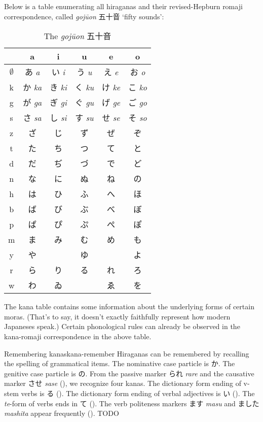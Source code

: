 \documentclass[UTF8, a4paper, oneside, scheme=plain]{ctexrep}
\newcommand{\corpus}[1]{\emph{#1}}
\newcommand{\translate}[1]{`#1'}
\begin{document}
Below is a table enumerating all hiraganas and their revised-Hepburn romaji correspondence, 
called \corpus{gojūon} 五十音 \translate{fifty sounds}:
\begin{table}[H]
    \caption{The \corpus{gojūon} 五十音}
    \label{tbl:hiragana-chart}
    \centering
    \begin{tabular}{cccccc}
        \toprule
         & a & i & u & e & o \\ 
        \midrule
        $\emptyset$ & あ \corpus{a} & い \corpus{i} & う \corpus{u} & え \corpus{e} & お \corpus{o} \\ 
        k & か \corpus{ka} & き \corpus{ki} & く \corpus{ku} & け \corpus{ke} & こ \corpus{ko} \\ 
        g & が \corpus{ga} & ぎ \corpus{gi} & ぐ \corpus{gu} & げ \corpus{ge} & ご \corpus{go} \\ 
        s & さ \corpus{sa} & し \corpus{si} & す \corpus{su} & せ \corpus{se} & そ \corpus{so} \\ 
        z & ざ & じ & ず & ぜ & ぞ \\ 
        t & た & ち & つ & て & と \\ 
        d & だ & ぢ & づ & で & ど \\ 
        n & な & に & ぬ & ね & の \\ 
        h & は & ひ & ふ & へ & ほ \\ 
        b & ば & び & ぶ & べ & ぼ \\ 
        p & ぱ & ぴ & ぷ & ぺ & ぽ \\ 
        m & ま & み & む & め & も \\ 
        y & や & ~ & ゆ & ~ & よ \\ 
        r & ら & り & る & れ & ろ \\ 
        w & わ & ゐ & ~ & ゑ & を \\ 
        \bottomrule
    \end{tabular}
\end{table}

The kana table contains some information about the underlying forms of certain moras.
(That's to say, it doesn't exactly faithfully represent how modern Japaneses speak.)
Certain phonological rules can already be observed in the kana-romaji correspondence in the above table.

\begin{learnbox}{Remembering kanas}{kana-remember}
    Hiraganas can be remembered by recalling the spelling of grammatical items.
    The nominative case particle is か.
    The genitive case particle is の.
    From the passive marker られ \corpus{rare} and the causative marker させ \corpus{sase} 
    (),
    we recognize four kanas.
    The dictionary form ending of v-stem verbs is る ().
    The dictionary form ending of verbal adjectives is い ().
    The \corpus{te}-form of verbs ends in て ().
    The verb politeness markers ます \corpus{masu} and ました \corpus{mashita} appear frequently 
    ().
    TODO
\end{learnbox}
\end{document}
